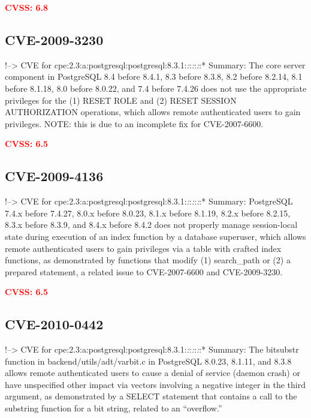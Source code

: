 \documentclass[a4paper, 12pt]{article}
\begin{document}
\textbf{\textcolor{red}{CVSS: 6.8}}

\hypertarget{cve-2009-3230}{%
\subsection{CVE-2009-3230}\label{cve-2009-3230}}

!--\textgreater{} CVE for
cpe:2.3:a:postgresql:postgresql:8.3.1:\emph{:}:\emph{:}:\emph{:}:*
Summary: The core server component in PostgreSQL 8.4 before 8.4.1, 8.3
before 8.3.8, 8.2 before 8.2.14, 8.1 before 8.1.18, 8.0 before 8.0.22,
and 7.4 before 7.4.26 does not use the appropriate privileges for the
(1) RESET ROLE and (2) RESET SESSION AUTHORIZATION operations, which
allows remote authenticated users to gain privileges. NOTE: this is due
to an incomplete fix for CVE-2007-6600.

\textbf{\textcolor{red}{CVSS: 6.5}}

\hypertarget{cve-2009-4136}{%
\subsection{CVE-2009-4136}\label{cve-2009-4136}}

!--\textgreater{} CVE for
cpe:2.3:a:postgresql:postgresql:8.3.1:\emph{:}:\emph{:}:\emph{:}:*
Summary: PostgreSQL 7.4.x before 7.4.27, 8.0.x before 8.0.23, 8.1.x
before 8.1.19, 8.2.x before 8.2.15, 8.3.x before 8.3.9, and 8.4.x before
8.4.2 does not properly manage session-local state during execution of
an index function by a database superuser, which allows remote
authenticated users to gain privileges via a table with crafted index
functions, as demonstrated by functions that modify (1) search\_path or
(2) a prepared statement, a related issue to CVE-2007-6600 and
CVE-2009-3230.

\textbf{\textcolor{red}{CVSS: 6.5}}

\hypertarget{cve-2010-0442}{%
\subsection{CVE-2010-0442}\label{cve-2010-0442}}

!--\textgreater{} CVE for
cpe:2.3:a:postgresql:postgresql:8.3.1:\emph{:}:\emph{:}:\emph{:}:*
Summary: The bitsubstr function in backend/utils/adt/varbit.c in
PostgreSQL 8.0.23, 8.1.11, and 8.3.8 allows remote authenticated users
to cause a denial of service (daemon crash) or have unspecified other
impact via vectors involving a negative integer in the third argument,
as demonstrated by a SELECT statement that contains a call to the
substring function for a bit string, related to an ``overflow.''
\end{document}
